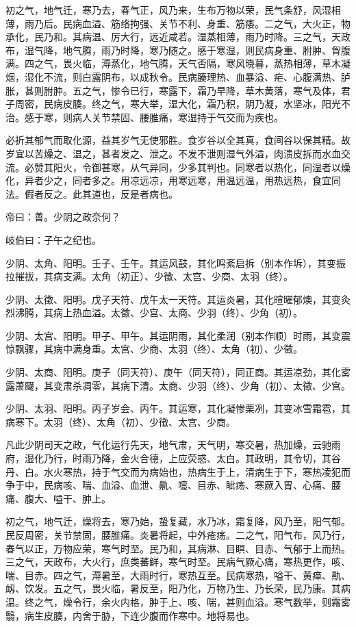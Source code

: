 \documentclass{article}%
\begin{document}
初之气，地气迁，寒乃去，春气正，风乃来，生布万物以荣，民气条舒，风湿相薄，雨乃后。民病血溢、筋络拘强、关节不利、身重、筋痿。二之气，大火正，物承化，民乃和。其病温、厉大行，远近咸若。湿蒸相薄，雨乃时降。三之气，天政布，湿气降，地气腾，雨乃时降，寒乃随之。感于寒湿，则民病身重、胕肿、胷腹满。四之气，畏火临，溽蒸化，地气腾，天气否隔，寒风晓暮，蒸热相薄，草木凝烟，湿化不流，则白露阴布，以成秋令。民病腠理热、血暴溢、疟、心腹满热、胪胀，甚则胕肿。五之气，惨令已行，寒露下，霜乃早降，草木黄落，寒气及体，君子周密，民病皮腠。终之气，寒大举，湿大化，霜乃积，阴乃凝，水坚冰，阳光不治。感于寒，则病人关节禁固、腰脽痛，寒湿持于气交而为疾也。

必折其郁气而取化源，益其岁气无使邪胜。食岁谷以全其真，食间谷以保其精。故岁宜以苦燥之、温之，甚者发之、泄之。不发不泄则湿气外溢，肉溃皮拆而水血交流。必赞其阳火，令御甚寒，从气异同，少多其判也。同寒者以热化，同湿者以燥化，异者少之，同者多之。用凉远凉，用寒远寒，用温远温，用热远热，食宜同法。假者反之。此其道也，反是者病也。

帝曰：善。少阴之政奈何？

岐伯曰：子午之纪也。

少阴、太角、阳明。壬子、壬午。其运风鼓，其化鸣紊启拆（别本作坼），其变振拉摧拔，其病支满。太角（初正）、少徵、太宫、少商、太羽（终）。

少阴、太徵、阳明。戊子天符、戊午太一天符。其运炎暑，其化暄曜郁燠，其变灸烈沸腾，其病上热血溢。太徵、少宫、太商、少羽（终）、少角（初）。

少阴、太宫、阳明。甲子、甲午。其运阴雨，其化柔润（别本作顺）时雨，其变震惊飘骤，其病中满身重。太宫、少商、太羽（终）、太角（初）、少徵。

少阴、太商、阳明。庚子（同天符）、庚午（同天符），同正商。其运凉劲，其化雾露萧飋，其变肃杀凋零，其病下清。太商、少羽（终）、少角（初）、太徵、少宫。

少阴、太羽、阳明。丙子岁会、丙午。其运寒，其化凝惨栗冽，其变冰雪霜雹，其病寒下。太羽（终）、太角（初）、少徵、太宫、少商。

凡此少阴司天之政，气化运行先天，地气肃，天气明，寒交暑，热加燥，云驰雨府，湿化乃行，时雨乃降，金火合德，上应荧惑、太白。其政明，其令切，其谷丹、白。水火寒热，持于气交而为病始也，热病生于上，清病生于下，寒热凌犯而争于中，民病咳、喘、血溢、血泄、鼽、嚏、目赤、眦疡、寒厥入胃、心痛、腰痛、腹大、嗌干、肿上。

初之气，地气迁，燥将去，寒乃始，蛰复藏，水乃冰，霜复降，风乃至，阳气郁。民反周密，关节禁固，腰脽痛。炎暑将起，中外疮疡。二之气，阳气布，风乃行，春气以正，万物应荣，寒气时至。民乃和，其病淋、目瞑、目赤、气郁于上而热。三之气，天政布，大火行，庶类蕃鲜，寒气时至。民病气厥心痛，寒热更作，咳、喘、目赤。四之气，溽暑至，大雨时行，寒热互至。民病寒热，嗌干、黄瘅、鼽、衂、饮发。五之气，畏火临，暑反至，阳乃化，万物乃生、乃长荣，民乃康。其病温。终之气，燥令行，余火内格，肿于上、咳、喘，甚则血溢。寒气数举，则霿雾翳，病生皮腠，内舍于胁，下连少腹而作寒中。地将易也。
\end{document}
